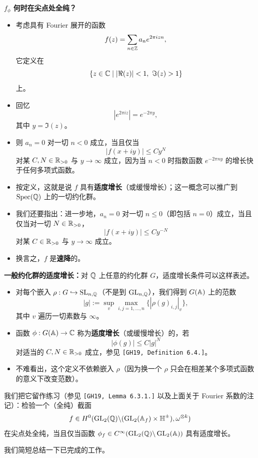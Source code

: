 \textbf{$f_\phi$ 何时在尖点处全纯？}
\begin{itemize}
\item 考虑具有 Fourier 展开的函数
\[
f(z)=\sum_{n\in\mathbb{Z}}a_ne^{2\pi izn},
\]
它定义在
\[
\{z\in\C\mid|\Re(z)|<1,\ \Im(z)>1\}
\]
上。
\item 回忆
\[
|e^{2\pi iz}|=e^{-2\pi y},
\]
其中 $y=\Im(z)$。
\item 则 $a_n=0$ 对一切 $n<0$ 成立，当且仅当
\[
|f(x+iy)|\le Cy^N
\]
对某 $C,N\in\mathbb{R}_{>0}$ 与 $y\to\infty$ 成立，因为当 $n<0$ 时指数函数 $e^{-2\pi ny}$ 的增长快于任何多项式函数。
\item 按定义，这就是说 $f$ 具有\textbf{适度增长}（或缓慢增长）；这一概念可以推广到 $\operatorname{Spec}(\mathbb{Q})$ 上的一切约化群。
\item 我们还要指出：进一步地，$a_n=0$ 对一切 $n\le0$（即包括 $n=0$）成立，当且仅当对一切 $N\in\mathbb{R}_{>0}$，
\[
|f(x+iy)|\le Cy^{-N}
\]
对某 $C\in\mathbb{R}_{>0}$ 与 $y\to\infty$ 成立。
\item 换言之，$f$ 是\textbf{速降}的。
\end{itemize}

\textbf{一般约化群的适度增长：}对 $\mathbb{Q}$ 上任意的约化群 $G$，适度增长条件可以这样表述。
\begin{itemize}
\item 对每个嵌入 $\rho:G\hookrightarrow\operatorname{SL}_{n,\mathbb{Q}}$（不是到 $\operatorname{GL}_{n,\mathbb{Q}}$），我们得到 $G(\mathbb{A})$ 上的范数
\[
|g|:=\sup_v\max_{i,j=1,\dots,n}\{|\rho(g)_{i,j}|_v\},
\]
其中 $v$ 遍历一切素数与 $\infty$。
\item 函数 $\phi:G(\mathbb{A})\to\mathbb{C}$ 称为\textbf{适度增长}（或缓慢增长）的，若
\[
|\phi(g)|\le C|g|^N
\]
对适当的 $C,N\in\mathbb{R}_{>0}$ 成立，参见 \texttt{[GH19, Definition 6.4.]}。
\item 不难看出，这个定义不依赖嵌入 $\rho$（因为换一个 $\rho$ 只会在相差某个多项式函数的意义下改变范数）。
\end{itemize}

我们把它留作练习（参见 \texttt{[GH19, Lemma 6.3.1.]} 以及上面关于 Fourier 系数的注记）：检验一个（全纯）截面
\[
f\in H^0(\operatorname{GL}_2(\mathbb{Q})\backslash(\operatorname{GL}_2(\mathbb{A}_f)\times\mathbb{H}^\pm),\omega^{\otimes k})
\]
在尖点处全纯，当且仅当函数 $\phi_f\in C^\infty(\operatorname{GL}_2(\mathbb{Q})\backslash\operatorname{GL}_2(\mathbb{A}))$ 具有适度增长。

我们简短总结一下已完成的工作。

